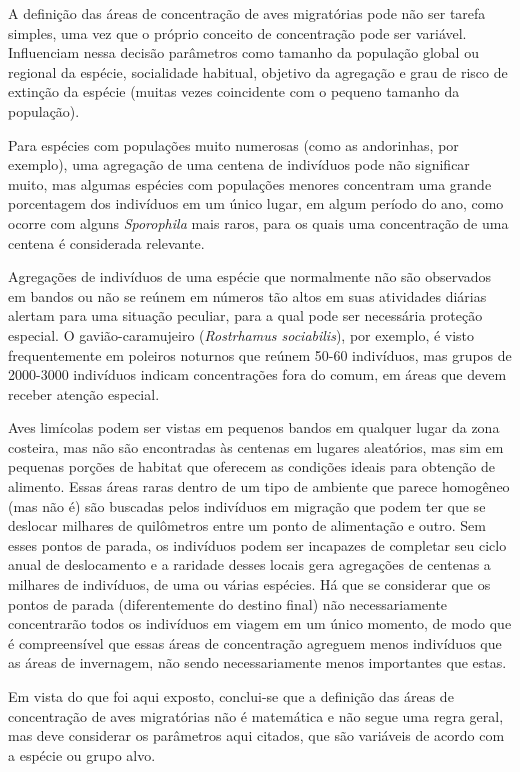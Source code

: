 \documentclass[
  oneside]{scrbook}
\begin{document}
A definição das áreas de concentração de aves migratórias pode não ser tarefa simples, uma vez que o próprio conceito de concentração pode ser variável. Influenciam nessa decisão parâmetros como tamanho da população global ou regional da espécie, socialidade habitual, objetivo da agregação e grau de risco de extinção da espécie (muitas vezes coincidente com o pequeno tamanho da população).

Para espécies com populações muito numerosas (como as andorinhas, por exemplo), uma agregação de uma centena de indivíduos pode não significar muito, mas algumas espécies com populações menores concentram uma grande porcentagem dos indivíduos em um único lugar, em algum período do ano, como ocorre com alguns \emph{Sporophila} mais raros, para os quais uma concentração de uma centena é considerada relevante.

Agregações de indivíduos de uma espécie que normalmente não são observados em bandos ou não se reúnem em números tão altos em suas atividades diárias alertam para uma situação peculiar, para a qual pode ser necessária proteção especial. O gavião-caramujeiro (\emph{Rostrhamus sociabilis}), por exemplo, é visto frequentemente em poleiros noturnos que reúnem 50-60 indivíduos, mas grupos de 2000-3000 indivíduos indicam concentrações fora do comum, em áreas que devem receber atenção especial.

Aves limícolas podem ser vistas em pequenos bandos em qualquer lugar da zona costeira, mas não são encontradas às centenas em lugares aleatórios, mas sim em pequenas porções de habitat que oferecem as condições ideais para obtenção de alimento. Essas áreas raras dentro de um tipo de ambiente que parece homogêneo (mas não é) são buscadas pelos indivíduos em migração que podem ter que se deslocar milhares de quilômetros entre um ponto de alimentação e outro. Sem esses pontos de parada, os indivíduos podem ser incapazes de completar seu ciclo anual de deslocamento e a raridade desses locais gera agregações de centenas a milhares de indivíduos, de uma ou várias espécies. Há que se considerar que os pontos de parada (diferentemente do destino final) não necessariamente concentrarão todos os indivíduos em viagem em um único momento, de modo que é compreensível que essas áreas de concentração agreguem menos indivíduos que as áreas de invernagem, não sendo necessariamente menos importantes que estas.

Em vista do que foi aqui exposto, conclui-se que a definição das áreas de concentração de aves migratórias não é matemática e não segue uma regra geral, mas deve considerar os parâmetros aqui citados, que são variáveis de acordo com a espécie ou grupo alvo.
\end{document}

